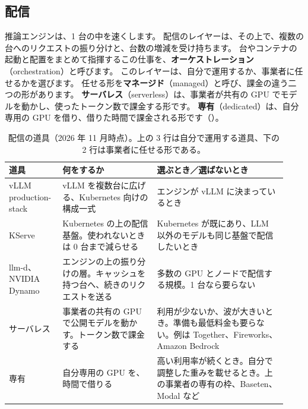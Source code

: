\subsection{配信}\label{sec:tm-deploy}

推論エンジンは、1 台の中を速くします。
配信のレイヤーは、その上で、複数の台へのリクエストの振り分けと、台数の増減を受け持ちます。
台やコンテナの起動と配置をまとめて指揮するこの仕事を、\textbf{オーケストレーション}（orchestration）と呼びます。
このレイヤーは、自分で運用するか、事業者に任せるかを選びます。
任せる形を\textbf{マネージド}（managed）と呼び、課金の違う二つの形があります。
\textbf{サーバレス}（serverless）は、事業者が共有の GPU でモデルを動かし、使ったトークン数で課金する形です。
\textbf{専有}（dedicated）は、自分専用の GPU を借り、借りた時間で課金される形です（）。

\begin{table}[htbp]
\centering\footnotesize
\caption{配信の道具（2026 年 11 月時点）。上の 3 行は自分で運用する道具、下の 2 行は事業者に任せる形である。}
\label{tab:tm-deploy}
\begin{tabular}{@{}>{\raggedright\arraybackslash}p{0.17\linewidth}>{\raggedright\arraybackslash}p{0.32\linewidth}>{\raggedright\arraybackslash}p{0.44\linewidth}@{}}
\toprule
道具 & 何をするか & 選ぶとき／選ばないとき \\
\midrule
vLLM production-stack & vLLM を複数台に広げる、Kubernetes 向けの構成一式 & エンジンが vLLM に決まっているとき \\
\addlinespace[2pt]
KServe & Kubernetes の上の配信基盤。使われないときは 0 台まで減らせる & Kubernetes が既にあり、LLM 以外のモデルも同じ基盤で配信したいとき \\
\addlinespace[2pt]
llm-d、NVIDIA Dynamo & エンジンの上の振り分けの層。キャッシュを持つ台へ、続きのリクエストを送る & 多数の GPU とノードで配信する規模。1 台なら要らない \\
\midrule
サーバレス & 事業者の共有の GPU で公開モデルを動かす。トークン数で課金する & 利用が少ないか、波が大きいとき。準備も最低料金も要らない。例は Together、Fireworks、Amazon Bedrock \\
\addlinespace[2pt]
専有 & 自分専用の GPU を、時間で借りる & 高い利用率が続くとき。自分で調整した重みを載せるとき。上の事業者の専有の枠、Baseten、Modal など \\
\bottomrule
\end{tabular}
\end{table}

